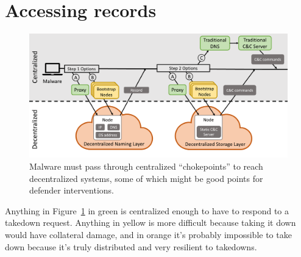 \documentclass[10pt,sigconf,letterpaper]{acmart}
\begin{document}


\section{Accessing records}

\begin{figure}[t]
	\centering
	\includegraphics[width=\textwidth]{figs/malware_contacting_cnc.pdf}
	\caption{Malware must pass through centralized ``chokepoints'' to reach 
		decentralized systems, some of which might be good points for defender 
		interventions.}
	\label{fig:malware_contacting_cnc}
\end{figure}

Anything in Figure~\ref{fig:malware_contacting_cnc} in green is centralized 
enough to have to respond to a takedown request. Anything in yellow is 
more difficult because taking it down would have collateral damage, and in 
orange it's probably impossible to take down because it's truly distributed and 
very resilient to takedowns.
\end{document}
